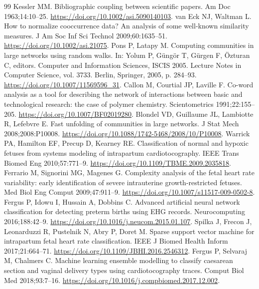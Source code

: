 \begin{thebibliography}{99}
 Kessler MM. Bibliographic coupling between scientific papers. Am Doc 1963;14:10--25. \href{https://doi.org/10.1002/asi.5090140103}{https://doi.org/10.1002/asi.5090140103}.
 van Eck NJ, Waltman L. How to normalize cooccurrence data? An analysis of some well-known similarity measures. J Am Soc Inf Sci Technol 2009;60:1635--51. \href{https://doi.org/10.1002/asi.21075}{https://doi.org/10.1002/asi.21075}.
 Pons P, Latapy M. Computing communities in large networks using random walks. In: Yolum P, Güngör T, Gürgen F, Özturan C, editors. Computer and Information Sciences, ISCIS 2005. Lecture Notes in Computer Science, vol. 3733. Berlin, Springer, 2005, p. 284--93. \href{https://doi.org/10.1007/11569596_31}{https://doi.org/10.1007/11569596\_31}.
 Callon M, Courtial JP, Laville F. Co-word analysis as a tool for describing the network of interactions between basic and technological research: the case of polymer chemistry. Scientometrics 1991;22:155--205. \href{https://doi.org/10.1007/BF02019280}{https://doi.org/10.1007/BF02019280}.
 Blondel VD, Guillaume JL, Lambiotte R, Lefebvre E. Fast unfolding of communities in large networks. J Stat Mech 2008;2008:P10008. \href{https://doi.org/10.1088/1742-5468/2008/10/P10008}{https://doi.org/10.1088/1742-5468/2008/10/P10008}.
 Warrick PA, Hamilton EF, Precup D, Kearney RE. Classification of normal and hypoxic fetuses from systems modeling of intrapartum cardiotocography. IEEE Trans Biomed Eng 2010;57:771--9. \href{https://doi.org/10.1109/TBME.2009.2035818}{https://doi.org/10.1109/TBME.2009.2035818}.
 Ferrario M, Signorini MG, Magenes G. Complexity analysis of the fetal heart rate variability: early identification of severe intrauterine growth-restricted fetuses. Med Biol Eng Comput 2009;47:911--9. \href{https://doi.org/10.1007/s11517-009-0502-8}{https://doi.org/10.1007/s11517-009-0502-8}.
 Fergus P, Idowu I, Hussain A, Dobbins C. Advanced artificial neural network classification for detecting preterm births using EHG records. Neurocomputing 2016;188:42--9. \href{https://doi.org/10.1016/j.neucom.2015.01.107}{https://doi.org/10.1016/j.neucom.2015.01.107}.
 Spilka J, Frecon J, Leonarduzzi R, Pustelnik N, Abry P, Doret M. Sparse support vector machine for intrapartum fetal heart rate classification. IEEE J Biomed Health Inform 2017;21:664--71. \href{https://doi.org/10.1109/JBHI.2016.2546312}{https://doi.org/10.1109/JBHI.2016.2546312}.
 Fergus P, Selvaraj M, Chalmers C. Machine learning ensemble modelling to classify caesarean section and vaginal delivery types using cardiotocography traces. Comput Biol Med 2018;93:7--16. \href{https://doi.org/10.1016/j.compbiomed.2017.12.002}{https://doi.org/10.1016/j.compbiomed.2017.12.002}.

\end{thebibliography}
